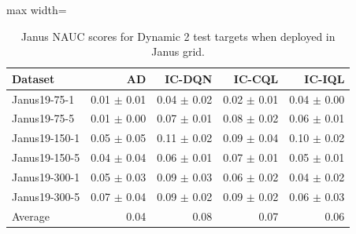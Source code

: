 \documentclass{article}
\begin{document}
\begin{table}[ht]
    \label{tab:}
    \begin{center}
    \caption{Janus NAUC scores for Dynamic 2 test targets when deployed in Janus grid.}
    \begin{small}
    \begin{adjustbox}{max width=\columnwidth}
		\begin{tabular}{l|rrrr}
		\toprule
	\textbf{Dataset} & \textbf{AD} & \textbf{IC-DQN} & \textbf{IC-CQL} & \textbf{IC-IQL}\\
\midrule
Janus19-75-1 & 0.01 $\pm$ 0.01 & 0.04 $\pm$ 0.02 & 0.02 $\pm$ 0.01 & 0.04 $\pm$ 0.00\\
Janus19-75-5 & 0.01 $\pm$ 0.00 & 0.07 $\pm$ 0.01 & 0.08 $\pm$ 0.02 & 0.06 $\pm$ 0.01\\
Janus19-150-1 & 0.05 $\pm$ 0.05 & 0.11 $\pm$ 0.02 & 0.09 $\pm$ 0.04 & 0.10 $\pm$ 0.02\\
Janus19-150-5 & 0.04 $\pm$ 0.04 & 0.06 $\pm$ 0.01 & 0.07 $\pm$ 0.01 & 0.05 $\pm$ 0.01\\
Janus19-300-1 & 0.05 $\pm$ 0.03 & 0.09 $\pm$ 0.03 & 0.06 $\pm$ 0.02 & 0.04 $\pm$ 0.02\\
Janus19-300-5 & 0.07 $\pm$ 0.04 & 0.09 $\pm$ 0.02 & 0.09 $\pm$ 0.02 & 0.06 $\pm$ 0.03\\
\midrule
Average & 0.04 & 0.08 & 0.07 & 0.06\\
\end{tabular}
        \end{adjustbox}
    \end{small}
    \end{center}
    \vskip -0.1in
\end{table}
\end{document}
